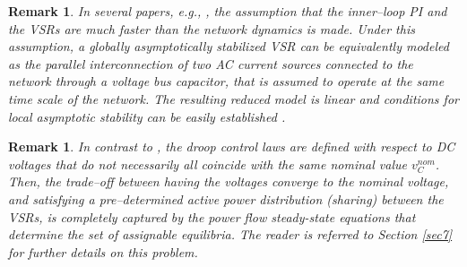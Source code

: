 \documentclass[5p,twocolumn]{elsarticle}
\def\begrem{\begin{remark}\rm}
\def\endrem{\end{remark}}
\newtheorem{remark}[theorem]{Remark}
\numberwithin{equation}{section}
\begin{document}
\begin{remark}\em
In several papers, {\em e.g.},  \cite{sandberg,bencha}, the assumption that the inner--loop PI and the VSRs are much faster than the network dynamics is made. Under this assumption, a globally asymptotically stabilized VSR can be equivalently modeled as the parallel interconnection of two AC current sources connected to the network through a voltage bus capacitor, that is assumed to operate at the same time scale of the network. The resulting reduced model is linear and conditions for {\em local} asymptotic stability can be easily established \cite{sandberg,dorfler}.
\end{remark}
\begrem
In contrast to \cite{sandberg,sun}, the droop control laws are defined with respect to DC voltages that do not necessarily all coincide with the same nominal value $v_C^{nom}$. Then, the trade--off between having the voltages converge to the nominal voltage, and satisfying a pre--determined active power distribution (\textit{sharing}) between the VSRs, is completely captured by the power flow steady-state equations that determine the set of assignable equilibria. The reader is referred to Section \ref{sec7} for further details on this problem.
\endrem
\end{document}
